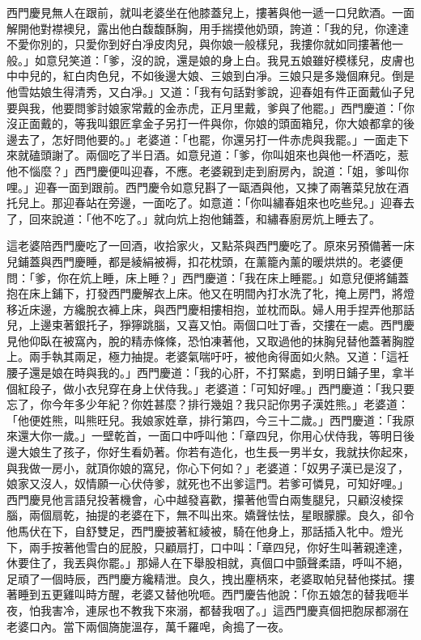 西門慶見無人在跟前，就叫老婆坐在他膝蓋兒上，摟著與他一遞一口兒飲酒。一面解開他對襟襖兒，露出他白馥馥酥胸，用手揣摸他奶頭，誇道：「我的兒，你達達不愛你別的，只愛你到好白凈皮肉兒，與你娘一般樣兒，我摟你就如同摟著他一般。」如意兒笑道：「爹，沒的說，還是娘的身上白。我見五娘雖好模樣兒，皮膚也中中兒的，紅白肉色兒，不如後邊大娘、三娘到白凈。三娘只是多幾個麻兒。倒是他雪姑娘生得清秀，又白凈。」又道：「我有句話對爹說，迎春姐有件正面戴仙子兒要與我，他要問爹討娘家常戴的金赤虎，正月里戴，爹與了他罷。」西門慶道：「你沒正面戴的，等我叫銀匠拿金子另打一件與你，你娘的頭面箱兒，你大娘都拿的後邊去了，怎好問他要的。」老婆道：「也罷，你還另打一件赤虎與我罷。」一面走下來就磕頭謝了。兩個吃了半日酒。如意兒道：「爹，你叫姐來也與他一杯酒吃，惹他不惱麼？」西門慶便叫迎春，不應。老婆親到走到廚房內，說道：「姐，爹叫你哩。」迎春一面到跟前。西門慶令如意兒斟了一甌酒與他，又揀了兩箸菜兒放在酒托兒上。那迎春站在旁邊，一面吃了。如意道：「你叫繡春姐來也吃些兒。」迎春去了，回來說道：「他不吃了。」就向炕上抱他鋪蓋，和繡春廚房炕上睡去了。

這老婆陪西門慶吃了一回酒，收拾家火，又點茶與西門慶吃了。原來另預備著一床兒鋪蓋與西門慶睡，都是綾絹被褥，扣花枕頭，在薰籠內薰的暖烘烘的。老婆便問：「爹，你在炕上睡，床上睡？」西門慶道：「我在床上睡罷。」如意兒便將鋪蓋抱在床上鋪下，打發西門慶解衣上床。他又在明間內打水洗了牝，掩上房門，將燈移近床邊，方纔脫衣褲上床，與西門慶相摟相抱，並枕而臥。婦人用手捏弄他那話兒，上邊束著銀托子，猙獰跳腦，又喜又怕。兩個口吐丁香，交摟在一處。西門慶見他仰臥在被窩內，脫的精赤條條，恐怕凍著他，又取過他的抹胸兒替他蓋著胸膛上。兩手執其兩足，極力抽提。老婆氣喘吁吁，被他肏得面如火熱。又道：「這衽腰子還是娘在時與我的。」西門慶道：「我的心肝，不打緊處，到明日鋪子里，拿半個紅段子，做小衣兒穿在身上伏侍我。」老婆道：「可知好哩。」西門慶道：「我只要忘了，你今年多少年紀？你姓甚麼？排行幾姐？我只記你男子漢姓熊。」老婆道：「他便姓熊，叫熊旺兒。我娘家姓章，排行第四，今三十二歲。」西門慶道：「我原來還大你一歲。」一壁乾首，一面口中呼叫他：「章四兒，你用心伏侍我，等明日後邊大娘生了孩子，你好生看奶著。你若有造化，也生長一男半女，我就扶你起來，與我做一房小，就頂你娘的窩兒，你心下何如？」老婆道：「奴男子漢已是沒了，娘家又沒人，奴情願一心伏侍爹，就死也不出爹這門。若爹可憐見，可知好哩。」西門慶見他言語兒投著機會，心中越發喜歡，攥著他雪白兩隻腿兒，只顧沒棱探腦，兩個扇乾，抽提的老婆在下，無不叫出來。嬌聲怯怯，星眼朦朦。良久，卻令他馬伏在下，自舒雙足，西門慶披著紅綾被，騎在他身上，那話插入牝中。燈光下，兩手按著他雪白的屁股，只顧扇打，口中叫：「章四兒，你好生叫著親達達，休要住了，我丟與你罷。」那婦人在下舉股相就，真個口中顫聲柔語，呼叫不絕，足頑了一個時辰，西門慶方纔精泄。良久，拽出麈柄來，老婆取帕兒替他搽拭。摟著睡到五更雞叫時方醒，老婆又替他吮咂。西門慶告他說：「你五娘怎的替我咂半夜，怕我害冷，連尿也不教我下來溺，都替我咽了。」這西門慶真個把胞尿都溺在老婆口內。當下兩個旖旎溫存，萬千羅唣，肏搗了一夜。

